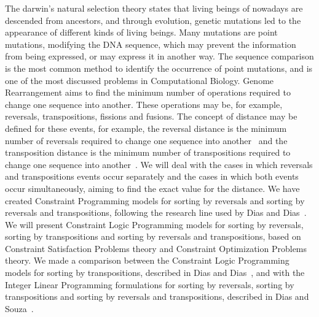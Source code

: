 The darwin's natural selection theory states that living beings of
nowadays are descended from ancestors, and through evolution, genetic
mutations led to the appearance of different kinds of living beings. Many
mutations are point mutations, modifying the DNA sequence, which may
prevent the information from being expressed, or may express it in
another way. The sequence comparison is the most common method to
identify the occurrence of point mutations, and is one of the most
discussed problems in Computational Biology. Genome Rearrangement aims
to find the minimum number of operations required to change one sequence
into another. These operations may be, for example, reversals,
transpositions, fissions and fusions. The concept of distance may be
defined for these events, for example, the reversal distance is the
minimum number of reversals required to change one sequence into
another~\cite{BafnaPevzner*1996} and the transposition distance is the
minimum number of transpositions required to change one sequence into
another~\cite{BafnaPevzner*1998}. We will deal with the cases in which
reversals and transpositions events occur separately and the cases in
which both events occur simultaneously, aiming to find the exact value
for the distance. We have created Constraint Programming models for
sorting by reversals and sorting by reversals and transpositions,
following the research line used by Dias and Dias~\cite{DiasDias*2009}.
We will present Constraint Logic Programming models for sorting by
reversals, sorting by transpositions and sorting by reversals and
transpositions, based on Constraint Satisfaction Problems theory and
Constraint Optimization Problems theory. We made a comparison between
the Constraint Logic Programming models for sorting by transpositions,
described in Dias and Dias~\cite{DiasDias*2009}, and with the Integer
Linear Programming formulations for sorting by reversals, sorting by
transpositions and sorting by reversals and transpositions, described in
Dias and Souza~\cite{DiasSouza*2007}.

